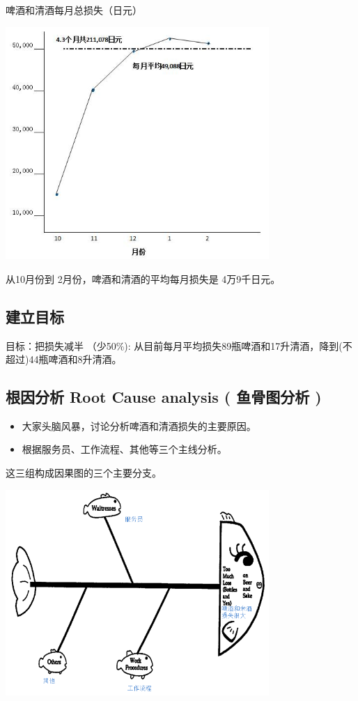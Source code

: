 啤酒和清酒每月总损失（日元）


\includegraphics[width=10cm]{club91.jpg}

从10月份到 2月份，啤酒和清酒的平均每月损失是 4万9千日元。

\hypertarget{ux5efaux7acbux76eeux6807}{%
\subsection{建立目标}\label{ux5efaux7acbux76eeux6807}}

目标：把损失减半 （少50\%):
从目前每月平均损失89瓶啤酒和17升清酒，降到(不超过)44瓶啤酒和8升清酒。

\hypertarget{ux6839ux56e0ux5206ux6790-root-cause-analysis-ux9c7cux9aa8ux56feux5206ux6790}{%
\subsection{根因分析 Root Cause analysis ( 鱼骨图分析
)}\label{ux6839ux56e0ux5206ux6790-root-cause-analysis-ux9c7cux9aa8ux56feux5206ux6790}}

\begin{itemize}
\tightlist
\item
  大家头脑风暴，讨论分析啤酒和清酒损失的主要原因。
\item
  根据服务员、工作流程、其他等三个主线分析。
\end{itemize}

这三组构成因果图的三个主要分支。


\includegraphics[width=10cm]{club111.png}

